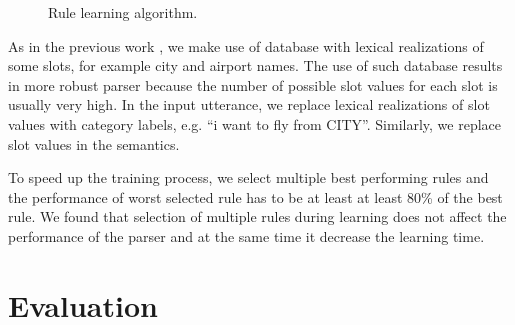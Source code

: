 \documentclass[11pt]{article}
\begin{document}
\begin{figure}
\caption{Rule learning algorithm.}
\label{alg:tbl:learning}
\end{figure} 

As in the previous work \cite{zettlemoyer07,mairesse09,meza08b}, we make use of database with lexical realizations of some slots, for example city and airport names. The use of such database results in more robust parser because the number of possible slot values for each slot is usually very high. In the input utterance, we replace lexical realizations of slot values with category labels, e.g. ``i want to fly from CITY''. Similarly, we replace slot values in the semantics.

To speed up the training process, we select multiple best performing rules and the performance of worst selected rule has to be at least at least 80\% of the best rule. We found that selection of multiple rules during learning does not affect the performance of the parser and at the same time it decrease the learning time.


\section{Evaluation} \label{sec:evaluation}
\end{document}

